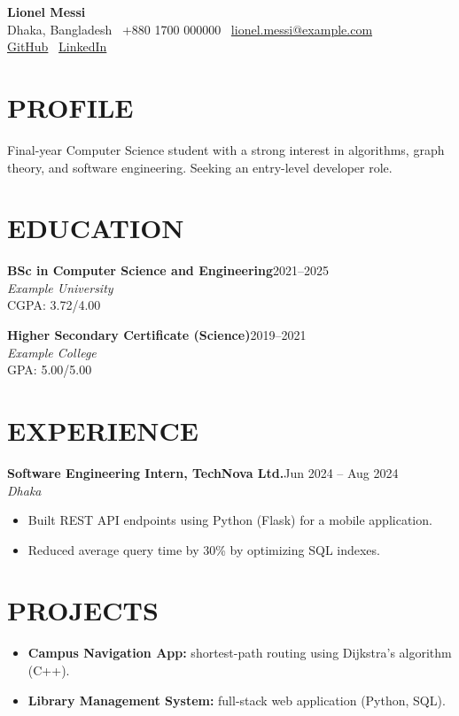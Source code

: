 \documentclass[11pt,a4paper]{article}
\newcommand{\cventry}[4]{
    \noindent
    \textbf{#1}\hfill #2\\
    \textit{#3}\\
    #4
    \vspace{3pt}
}
\begin{document}
\begin{center}
    {\LARGE\bfseries Lionel Messi}\\[4pt]
    Dhaka, Bangladesh \textbar\
    +880 1700 000000 \textbar\
    \href{mailto:lionel.messi@example.com}
    {lionel.messi@example.com}\\[3pt]

    \href{https://github.com/messi}{GitHub}
    \textbar\
    \href{https://linkedin.com/in/messi}{LinkedIn}
\end{center}

\section*{PROFILE}

Final-year Computer Science student with a strong
interest in algorithms, graph theory, and software
engineering. Seeking an entry-level developer role.

\section*{EDUCATION}

\cventry
{BSc in Computer Science and Engineering}
{2021--2025}
{Example University}
{CGPA: 3.72/4.00}

\cventry
{Higher Secondary Certificate (Science)}
{2019--2021}
{Example College}
{GPA: 5.00/5.00}

\section*{EXPERIENCE}

\cventry
{Software Engineering Intern, TechNova Ltd.}
{Jun 2024 -- Aug 2024}
{Dhaka}
{}

\begin{itemize}
    \item Built REST API endpoints using Python (Flask)
    for a mobile application.
    \item Reduced average query time by 30\% by
    optimizing SQL indexes.
\end{itemize}

\section*{PROJECTS}
\begin{itemize}
    \item \textbf{Campus Navigation App:}
    shortest-path routing using Dijkstra’s algorithm (C++).
    \item \textbf{Library Management System:}
    full-stack web application (Python, SQL).
\end{itemize}
\end{document}
